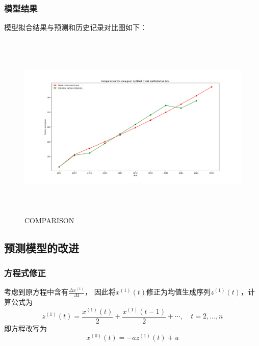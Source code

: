 \documentclass[a4paper, 12pt]{article}
\numberwithin{equation}{section}
\begin{document}
                \subsubsection{模型结果}
                    模型拟合结果与预测和历史记录对比图如下：
                    \begin{figure}[h]
                        \centering
                        \includegraphics[height=9cm,width=15cm]{fit_and_his_q4.png}
                        \caption{COMPARISON}
                    \end{figure}

    {}


    {}


    {}
        \subsection{预测模型的改进}
            \subsubsection{方程式修正}
                考虑到原方程中含有$ \frac{\Delta x^{ (1)}}{\Delta t} $，
                因此将$ x^{ (1)} (t) $修正为均值生成序列$ z^{ (1)} (t) $，计算公式为
                \[ z^{ (1)} (t) = \frac{x^{ (1)} (t)}{2} + \frac{x^{ (1)} (t - 1)}{2} + \cdots, \quad t = 2, \ldots, n \]
                即方程改写为
                \[ x^{ (0)} (t) = -az^{ (1)} (t) + u \]
\end{document}
